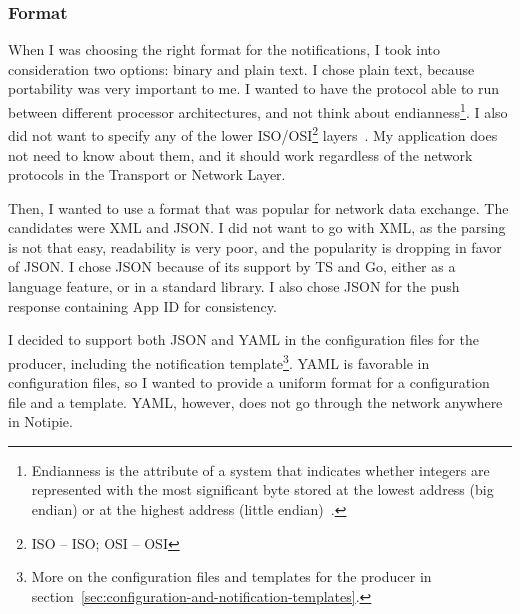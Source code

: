\subsubsection{Format}\label{sec:protocol-format}

When I was choosing the right format
for the notifications,
I took into consideration two options:
binary and plain text.
I chose plain text,
because portability was very important to me.
I wanted to have the protocol able to run
between different processor architectures,
and not think about endianness\footnote{
  Endianness is the attribute of a system
  that indicates whether integers are represented with
  the most significant byte
  stored at the lowest address (big endian)
  or at the highest address (little endian)~\cite{adiga_how_2007}.
}.
I also did not want to specify any of the lower
ISO/OSI\footnote{
  \acs{ISO} -- \acl{ISO}; \acs{OSI} -- \acl{OSI}
} layers~\cite{international_organization_for_standardization_isoiec_1994}.
My application does not need to know about them,
and it should work regardless of the network protocols
in the Transport or Network Layer.

Then, I wanted to use a format
that was popular for network data exchange.
The candidates were \ac{XML} and \ac{JSON}.
I did not want to go with \ac{XML},
as the parsing is not that easy,
readability is very poor,
and the popularity is dropping
in favor of \ac{JSON}.
I chose \ac{JSON}
because of its support by \ac{TS} and Go,
either as a language feature,
or in a standard library.
I also chose \ac{JSON} for the push response
containing App \ac{ID}
for consistency.

I decided to support both \ac{JSON} and \ac{YAML}
in the configuration files for the producer,
including the notification template\footnote{
  More on the configuration files and templates
  for the producer
  in section~\ref{sec:configuration-and-notification-templates}.
}.
\ac{YAML} is favorable in configuration files,
so I wanted to provide a uniform
format for a configuration file
and a template.
\ac{YAML}, however,
does not go through the network
anywhere in Notipie.
